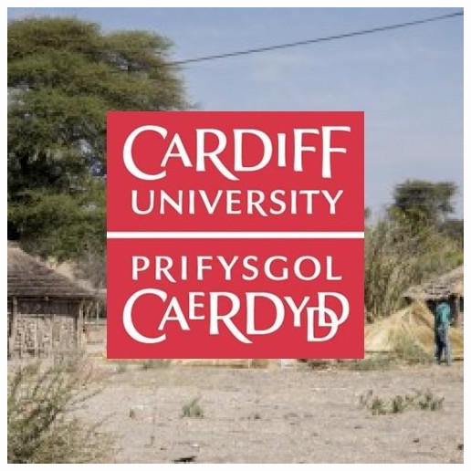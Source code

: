 \documentclass{beamer}
\begin{document}
\begin{frame}
\begin{columns}[T]
\begin{column}{.23\textwidth}
        \includegraphics[width=\textwidth]{static/phoenix-logo.jpg}
\end{column}%
\end{columns}
\end{frame}

\begin{frame}
    
\end{frame}
\begin{frame}
    
\end{frame}
\begin{frame}
    
\end{frame}
\begin{frame}
    
\end{frame}
\begin{frame}
    
\end{frame}
\begin{frame}
    
\end{frame}
\end{document}
